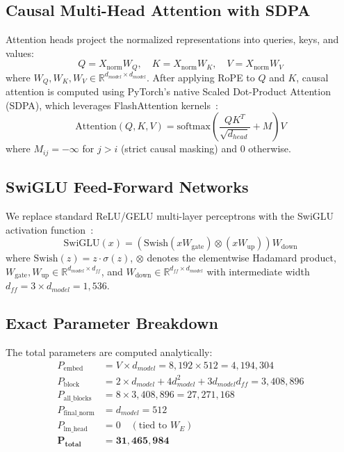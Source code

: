 \documentclass[10pt,twocolumn,letterpaper]{article}
\begin{document}
\subsection{Causal Multi-Head Attention with SDPA}
Attention heads project the normalized representations into queries, keys, and values:
\begin{equation}
Q = X_{\text{norm}} W_Q, \quad K = X_{\text{norm}} W_K, \quad V = X_{\text{norm}} W_V
\end{equation}
where $W_Q, W_K, W_V \in \mathbb{R}^{d_{model} \times d_{model}}$. After applying RoPE to $Q$ and $K$, causal attention is computed using PyTorch's native Scaled Dot-Product Attention (SDPA), which leverages FlashAttention kernels~\cite{dao2022flashattention}:
\begin{equation}
\text{Attention}(Q, K, V) = \text{softmax}\left(\frac{Q K^T}{\sqrt{d_{head}}} + M\right) V
\end{equation}
where $M_{ij} = -\infty$ for $j > i$ (strict causal masking) and $0$ otherwise.

\subsection{SwiGLU Feed-Forward Networks}
We replace standard ReLU/GELU multi-layer perceptrons with the SwiGLU activation function~\cite{shazeer2020glu}:
\begin{equation}
\text{SwiGLU}(x) = \left(\text{Swish}(x W_{\text{gate}}) \otimes (x W_{\text{up}})\right) W_{\text{down}}
\end{equation}
where $\text{Swish}(z) = z \cdot \sigma(z)$, $\otimes$ denotes the elementwise Hadamard product, $W_{\text{gate}}, W_{\text{up}} \in \mathbb{R}^{d_{model} \times d_{ff}}$, and $W_{\text{down}} \in \mathbb{R}^{d_{ff} \times d_{model}}$ with intermediate width $d_{ff} = 3 \times d_{model} = 1,536$.

\subsection{Exact Parameter Breakdown}
The total parameters are computed analytically:
\begin{align}
P_{\text{embed}} &= V \times d_{model} = 8,192 \times 512 = 4,194,304 \nonumber\\
P_{\text{block}} &= 2 \times d_{model} + 4 d_{model}^2 + 3 d_{model} d_{ff} = 3,408,896 \nonumber\\
P_{\text{all\_blocks}} &= 8 \times 3,408,896 = 27,271,168 \nonumber\\
P_{\text{final\_norm}} &= d_{model} = 512 \nonumber\\
P_{\text{lm\_head}} &= 0 \quad (\text{tied to } W_E) \nonumber\\
\mathbf{P_{\text{total}}} &= \mathbf{31,465,984}
\end{align}
\end{document}
